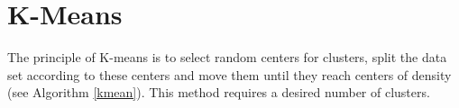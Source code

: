 \section{K-Means}
The principle of K-means is to select random centers for clusters, split the data set according to these centers and move them until they reach centers of density (see Algorithm \ref{kmean}). This method requires a desired number of clusters.

\begin{figure}[h!]
\begin{center}
\end{center}
\end{figure}
